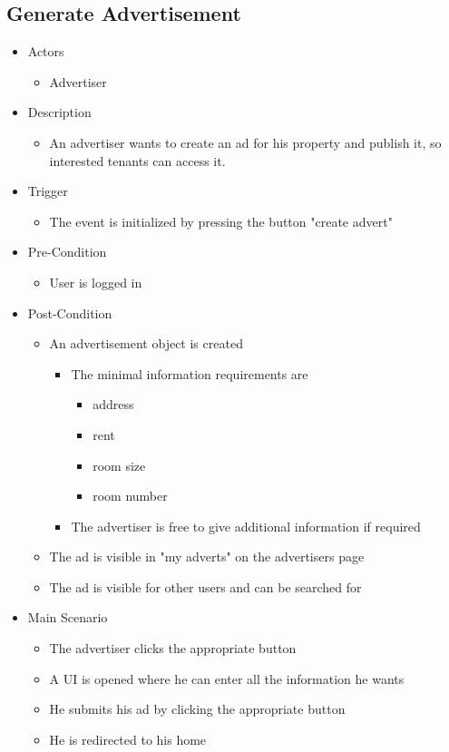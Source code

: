 \documentclass[a4paper,11pt]{article}
\begin{document}
\subsection*{Generate Advertisement}
\begin{itemize}
	\item Actors
		\begin{itemize}
			\item Advertiser
		\end{itemize}
	\item Description
		\begin{itemize}
			\item An advertiser wants to create an ad for his property and publish it, so interested tenants can access it.
		\end{itemize}
	\item Trigger
		\begin{itemize}
			\item The event is initialized by pressing the button "create advert"
		\end{itemize}
	\item Pre-Condition
		\begin{itemize}
			\item User is logged in
		\end{itemize}
	\item Post-Condition
		\begin{itemize}
			\item An advertisement object is created
				\begin{itemize}
					\item The minimal information requirements are
					\begin{itemize}
						\item address
						\item rent
						\item room size
						\item room number
					\end{itemize}
					\item The advertiser is free to give additional information if required
				\end{itemize}
			\item The ad is visible in "my adverts" on the advertisers page
			\item The ad is visible for other users and can be searched for
		\end{itemize}
	\item Main Scenario
		\begin{itemize}
			\item The advertiser clicks the appropriate button
			\item A UI is opened where he can enter all the information he wants
			\item He submits his ad by clicking the appropriate button
			\item He is redirected to his home
		\end{itemize}
\end{itemize}
\end{document}
